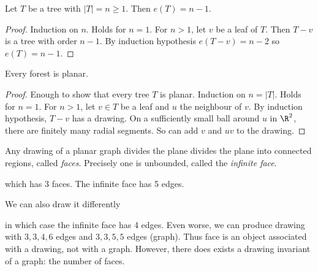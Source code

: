 \documentclass[a4paper]{article}
\begin{document}
\begin{proposition}
  \label{prop:edge of tree}
  Let \(T\) be a tree with \(|T| = n \geq 1\). Then \(e(T) = n - 1\).
\end{proposition}

\begin{proof}
  Induction on \(n\). Holds for \(n = 1\). For \(n >1\), let \(v\) be a leaf of \(T\). Then \(T - v\) is a tree with order \(n - 1\). By induction hypothesis \(e(T - v) = n - 2\) so \(e(T) = n - 1\).
\end{proof}

\begin{proposition}
  Every forest is planar.
\end{proposition}

\begin{proof}
  Enough to show that every tree \(T\) is planar. Induction on \(n = |T|\). Holds for \(n = 1\). For \(n > 1\), let \(v \in T\) be a leaf and \(u\) the neighbour of \(v\). By induction hypothesis, \(T - v\) has a drawing. On a sufficiently small ball around \(u\) in \(\R^2\), there are finitely many radial segments. So can add \(v\) and \(uv\) to the drawing.
\end{proof}

Any drawing of a planar graph divides the plane divides the plane into connected regions, called \emph{faces}. Precisely one is unbounded, called the \emph{infinite face}.

\begin{center}
\end{center}
which has 3 faces. The infinite face has 5 edges.

We can also draw it differently
\begin{center}
\end{center}

in which case the infinite face has 4 edges. Even worse, we can produce drawing with \(3, 3, 4, 6\) edges and \(3, 3, 5, 5\) edges (graph). Thus face is an object associated with a drawing, not with a graph. However, there does exists a drawing invariant of a graph: the number of faces.
\end{document}
